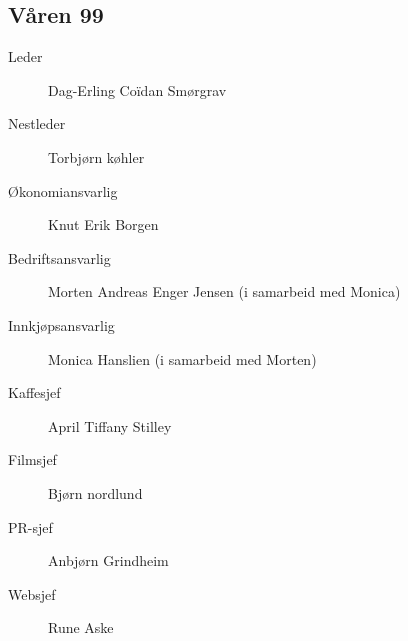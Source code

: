 {\begin{minipage}{0.6\textwidth}
\subsection*{Våren 99}

\begin{description}
	\item[Leder] Dag-Erling Coïdan Smørgrav
	\item[Nestleder] Torbjørn køhler
	\item[Økonomiansvarlig] Knut Erik Borgen
	\item[Bedriftsansvarlig] Morten Andreas Enger Jensen (i samarbeid med Monica)
	\item[Innkjøpsansvarlig] Monica Hanslien (i samarbeid med Morten)
	\item[Kaffesjef] April Tiffany Stilley
	\item[Filmsjef] Bjørn nordlund
	\item[PR-sjef] Anbjørn Grindheim
	\item[Websjef] Rune Aske
\end{description}
\end{minipage}
}
